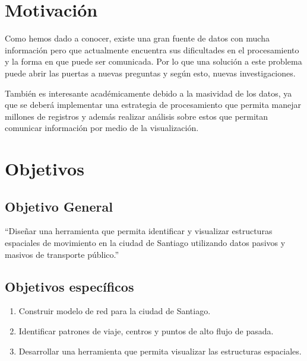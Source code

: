 \documentclass[12pt]{article}
\begin{document}
    \newpage
    \section{Motivación}


    Como hemos dado a conocer, existe una gran fuente de datos con mucha información pero que actualmente encuentra sus dificultades en el procesamiento y la forma en que puede ser comunicada. Por lo que una solución a este problema puede abrir las puertas a nuevas preguntas y según esto, nuevas investigaciones.

    También es interesante académicamente debido a la masividad de los datos, ya que se deberá implementar una estrategia de procesamiento que permita manejar millones de registros y además realizar análisis sobre estos que permitan comunicar información por medio de la visualización.

    \section{Objetivos}

    \subsection{Objetivo General}

    ``Diseñar una herramienta que permita identificar y visualizar estructuras espaciales de movimiento en la ciudad de Santiago utilizando datos pasivos y masivos de transporte público.''
    \subsection{Objetivos específicos}

    \begin{enumerate}
    \item Construir modelo de red para la ciudad de Santiago. %
    \item Identificar patrones de viaje, centros y puntos de alto flujo de pasada.
    \item Desarrollar una herramienta que permita visualizar las estructuras espaciales.
    \end{enumerate}
\end{document}
